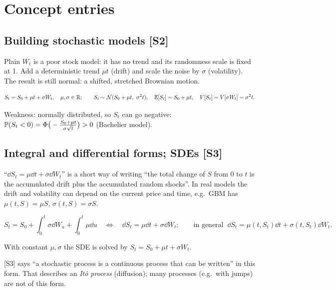\documentclass[10pt]{article}
\begin{document}
\section{Concept entries}

\subsection{Building stochastic models [S2]}
\begin{idea}
Plain $W_t$ is a poor stock model: it has no trend and its randomness scale is fixed at 1. Add a deterministic trend $\mu t$ (drift) and scale the noise by $\sigma$ (volatility). The result is still normal: a shifted, stretched Brownian motion.
\end{idea}
\[S_t=S_0+\mu t+\sigma W_t,\quad\mu,\sigma\in\mathbb{R};\qquad S_t\sim\mathcal{N}(S_0+\mu t,\ \sigma^2t),\quad \mathbb{E}[S_t]=S_0+\mu t,\quad V[S_t]=V[\sigma W_t]=\sigma^2t.\]
\begin{where}
\end{where}
\beyond{} Weakness: normally distributed, so $S_t$ can go negative: $\mathbb{P}(S_t<0)=\Phi\big(-\frac{S_0+\mu t}{\sigma\sqrt t}\big)>0$ (Bachelier model).

\subsection{Integral and differential forms; SDEs [S3]}
\begin{idea}
``$\dd S_t=\mu\dd t+\sigma\dd W_t$'' is a short way of writing ``the total change of $S$ from $0$ to $t$ is the accumulated drift plus the accumulated random shocks''. In real models the drift and volatility can depend on the current price and time, e.g.\ GBM has $\mu(t,S)=\mu S$, $\sigma(t,S)=\sigma S$.
\end{idea}
\[S_t=S_0+\int_0^t\sigma\dd W_u+\int_0^t\mu\dd u\quad\iff\quad \dd S_t=\mu\dd t+\sigma\dd W_t;\qquad\text{in general }\ \dd S_t=\mu(t,S_t)\dd t+\sigma(t,S_t)\dd W_t.\]
\begin{where}
\end{where}
With constant $\mu,\sigma$ the SDE is solved by $S_t=S_0+\mu t+\sigma W_t$.
\begin{exam}
\flag{} [S3] says ``a stochastic process is a continuous process that can be written'' in this form. That describes an \emph{It\^o process} (diffusion); many processes (e.g.\ with jumps) are not of this form.
\end{exam}
\end{document}
